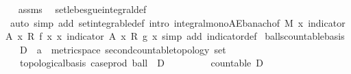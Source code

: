 \begin{isabellebody}
\isadelimproof
\ %
\endisadelimproof
%
\isatagproof
{}\isamarkupfalse%
\ assms\ \isamarkupfalse%
\ set{\isacharunderscore}{\kern0pt}lebesgue{\isacharunderscore}{\kern0pt}integral{\isacharunderscore}{\kern0pt}def\ \isamarkupfalse%
\ {\isacharparenleft}{\kern0pt}auto\ simp\ add{\isacharcolon}{\kern0pt}\ set{\isacharunderscore}{\kern0pt}integrable{\isacharunderscore}{\kern0pt}def\ intro{\isacharbang}{\kern0pt}{\isacharcolon}{\kern0pt}\ integral{\isacharunderscore}{\kern0pt}mono{\isacharunderscore}{\kern0pt}AE{\isacharunderscore}{\kern0pt}banach{\isacharbrackleft}{\kern0pt}of\ M\ {\isachardoublequoteopen}{\isasymlambda}x{\isachardot}{\kern0pt}\ indicator\ A\ x\ {\isacharasterisk}{\kern0pt}\isactrlsub R\ f\ x{\isachardoublequoteclose}\ {\isachardoublequoteopen}{\isasymlambda}x{\isachardot}{\kern0pt}\ indicator\ A\ x\ {\isacharasterisk}{\kern0pt}\isactrlsub R\ g\ x{\isachardoublequoteclose}{\isacharbrackright}{\kern0pt}{\isacharcomma}{\kern0pt}\ simp\ add{\isacharcolon}{\kern0pt}\ indicator{\isacharunderscore}{\kern0pt}def{\isacharparenright}{\kern0pt}%
\endisatagproof
{\isafoldproof}%
%
\isadelimproof
%
\endisadelimproof
%
\isadelimdocument
%
\endisadelimdocument
%
\isatagdocument
%
\isamarkuptrue%
%
\endisatagdocument
{\isafolddocument}%
%
\isadelimdocument
%
\endisadelimdocument
{}\isamarkupfalse%
\ balls{\isacharunderscore}{\kern0pt}countable{\isacharunderscore}{\kern0pt}basis{\isacharcolon}{\kern0pt}\isanewline
\ \ \ D\ {\isacharcolon}{\kern0pt}{\isacharcolon}{\kern0pt}\ {\isachardoublequoteopen}{\isacharprime}{\kern0pt}a\ {\isacharcolon}{\kern0pt}{\isacharcolon}{\kern0pt}\ {\isacharbraceleft}{\kern0pt}metric{\isacharunderscore}{\kern0pt}space{\isacharcomma}{\kern0pt}\ second{\isacharunderscore}{\kern0pt}countable{\isacharunderscore}{\kern0pt}topology{\isacharbraceright}{\kern0pt}\ set{\isachardoublequoteclose}\ \isanewline
\ \ \ {\isachardoublequoteopen}topological{\isacharunderscore}{\kern0pt}basis\ {\isacharparenleft}{\kern0pt}case{\isacharunderscore}{\kern0pt}prod\ ball\ {\isacharbackquote}{\kern0pt}\ {\isacharparenleft}{\kern0pt}D\ {\isasymtimes}\ {\isacharparenleft}{\kern0pt}{\isasymrat}\ {\isasyminter}\ {\isacharbraceleft}{\kern0pt}{}{\isacharless}{\kern0pt}{\isachardot}{\kern0pt}{\isachardot}{\kern0pt}{\isacharbraceright}{\kern0pt}{\isacharparenright}{\kern0pt}{\isacharparenright}{\kern0pt}{\isacharparenright}{\kern0pt}{\isachardoublequoteclose}\isanewline
\ \ \ \ \ {\isachardoublequoteopen}countable\ D{\isachardoublequoteclose}\isanewline

\end{isabellebody}
